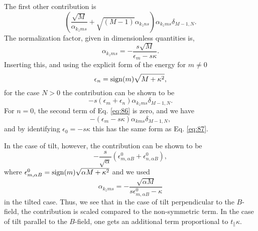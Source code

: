 The first other contribution is
\begin{equation}
  \label{eq:86}
  \left(\frac{\sqrt{M}}{\alpha_{k_z m s}} + \sqrt{(M-1)} \alpha_{k_z n s}\right) \alpha_{k_z m s} \delta_{M-1, N}.
\end{equation}
The normalization factor, given in dimensionless quantities is,
\[
\alpha_{k_z m s} = - \frac{s \sqrt{M}}{\epsilon_{m} - s \kappa}.
\]
Inserting this, and using the explicit form of the energy for \( m \neq 0 \)
\[
\epsilon_n = \operatorname{sign}(m) \sqrt{M + \kappa^2},
\]
for the case \( N > 0 \) the contribution can be shown to be
\begin{equation}
  \label{eq:87}
  -s (\epsilon_m + \epsilon_n)\alpha_{k_z m s} \delta_{M-1, N}.
\end{equation}
For \( n = 0 \), the second term of Eq. \eqref{eq:86} is zero, and we have
\begin{equation}
  \label{eq:88}
  -(\epsilon_m - s \kappa) \alpha_{k m s} \delta_{M-1, N},
\end{equation}
and by identifying \( \epsilon_0 = - s \kappa \) this has the same form as Eq. \eqref{eq:87}.

In the case of tilt, however, the contribution can be shown to be
\begin{equation}
  \label{eq:89}
  -\frac{s}{\sqrt{\alpha}} (\epsilon_{m, \alpha B}^0 + \epsilon_{n, \alpha B}^0),
\end{equation}
where \( \epsilon_{m, \alpha B}^0 = \operatorname{sign}(m) \sqrt{\alpha M + \kappa^2}  \) and we used
\[
\alpha_{k_z m s} = - \frac{\sqrt{\alpha M}}{s \epsilon^{0}_{m, \alpha B} - \kappa}
\]
in the tilted case.
Thus, we see that in the case of tilt perpendicular to the \( B \)-field, the contribution is scaled compared to the non-symmetric term.
In the case of tilt parallel to the \( B \)-field, one gets an additional term proportional to \( t_{\parallel} \kappa \).


